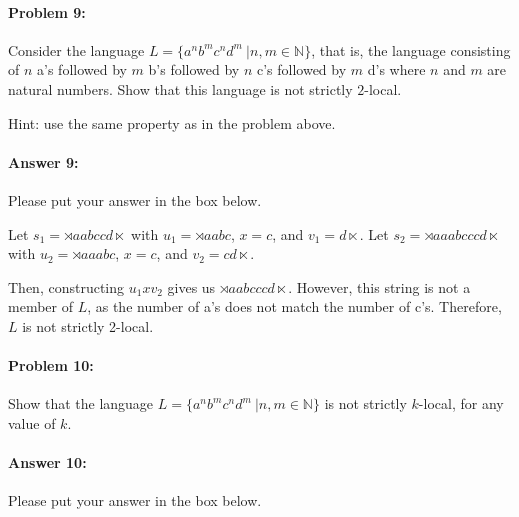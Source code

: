 \documentclass[10pt]{article}
\newenvironment{AnswerBox}{\begin{mdframed}[style=simple]}{\end{mdframed}}
\begin{document}
\hrulefill %

\paragraph{Problem 9:}

Consider the language
$L= \{a^n b^m c^n d^m\ | n, m \in \mathbb{N} \}$, that is, the
language consisting of $n$ a's followed by $m$ b's followed by $n$ c's
followed by $m$ d's where $n$ and $m$ are
natural numbers. Show that this language is not strictly $2$-local.

 Hint: use the same property as in the problem above.

\paragraph{Answer 9:} Please put your answer in the box below.


\begin{AnswerBox}%

    Let $s_1 = \rtimes aabccd \ltimes$ with $u_1 = \rtimes aabc$, $x = c$, and $v_1 = d\ltimes$.
    Let $s_2 = \rtimes aaabcccd \ltimes$ with $u_2 = \rtimes aaabc$, $x = c$, and $v_2 = cd\ltimes$.
    
    Then, constructing $u_1xv_2$ gives us $\rtimes aabcccd \ltimes$. However, this string is not a member of $L$, as the number of a's does not match the number of c's. Therefore, $L$ is not strictly 2-local.
    
\end{AnswerBox}%


\hrulefill %

\paragraph{Problem 10:}

Show that the language $L= \{a^n b^m c^n d^m\ | n, m \in \mathbb{N} \}$ is not
strictly $k$-local, for any value of $k$.

\paragraph{Answer 10:} Please put your answer in the box below.
\end{document}
